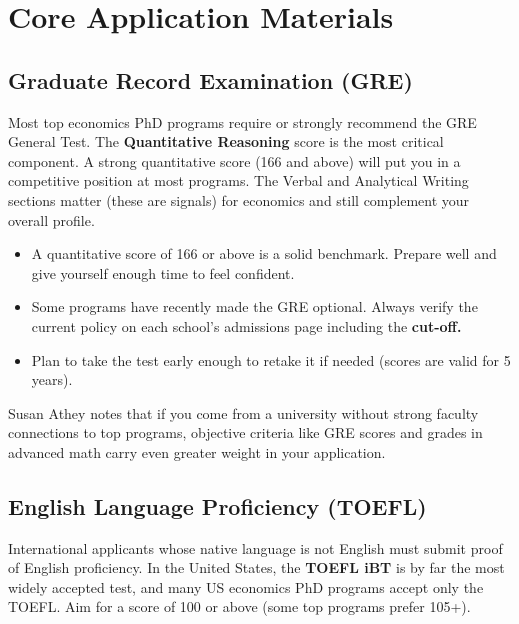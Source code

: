 \documentclass[11pt, letterpaper]{article}
\begin{document}
\newpage

\section{Core Application Materials}

\subsection{Graduate Record Examination (GRE)}

Most top economics PhD programs require or strongly recommend the GRE General Test. The \textbf{Quantitative Reasoning} score is the most critical component. A strong quantitative score (166 and above) will put you in a competitive position at most programs. The Verbal and Analytical Writing sections matter (these are signals) for economics and still complement your overall profile.

\begin{itemize}[leftmargin=*, itemsep=2pt]
    \item A quantitative score of 166 or above is a solid benchmark. Prepare well and give yourself enough time to feel confident.
    \item Some programs have recently made the GRE optional. Always verify the current policy on each school's admissions page including the \textbf{cut-off.}
    \item Plan to take the test early enough to retake it if needed (scores are valid for 5 years).
\end{itemize}

\begin{tipbox}
Susan Athey notes that if you come from a university without strong faculty connections to top programs, objective criteria like GRE scores and grades in advanced math carry even greater weight in your application.
\end{tipbox}


\subsection{English Language Proficiency (TOEFL)}

International applicants whose native language is not English must submit proof of English proficiency. In the United States, the \textbf{TOEFL iBT} is by far the most widely accepted test, and many US economics PhD programs accept only the TOEFL. Aim for a score of 100 or above (some top programs prefer 105+).
\end{document}

